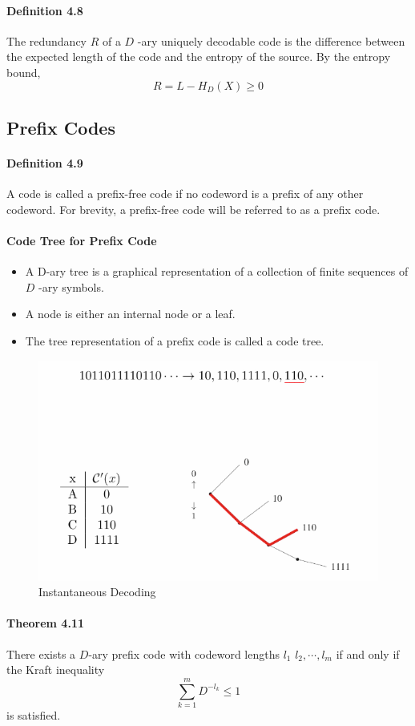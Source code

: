 \documentclass[8pt]{article}
\begin{document}
\begin{tcolorbox}
\paragraph{Definition 4.8} The redundancy $R$ of a $D$ -ary uniquely decodable code is the difference between the expected length of the code and the entropy of the source.
By the entropy bound,
$$
R=L-H_{D}(X) \geq 0
$$
\end{tcolorbox}

\newpage
\subsection{Prefix Codes}
\paragraph{Definition 4.9} A code is called a prefix-free code if no codeword is a prefix of any other codeword. For brevity, a prefix-free code will be referred to as a prefix code.

\paragraph{Code Tree for Prefix Code}
\begin{itemize}
    \item A D-ary tree is a graphical representation of a collection of finite sequences of $D$ -ary symbols.
    \item A node is either an internal node or a leaf.
    \item The tree representation of a prefix code is called a code tree.
\end{itemize}

\begin{figure}[!h]
    \centering
    \includegraphics[width=0.5\linewidth]{imgs/exp4_10.png}
    \caption{Instantaneous Decoding}
    \label{fig:my_label}
\end{figure}

\begin{tcolorbox}
\paragraph{Theorem 4.11} There exists a $D$-ary prefix code with codeword lengths $l_{1}$ $l_{2}, \cdots, l_{m}$ if and only if the Kraft inequality
$$
\sum_{k=1}^{m} D^{-l_{k}} \leq 1
$$
is satisfied.
\end{tcolorbox}
\end{document}
